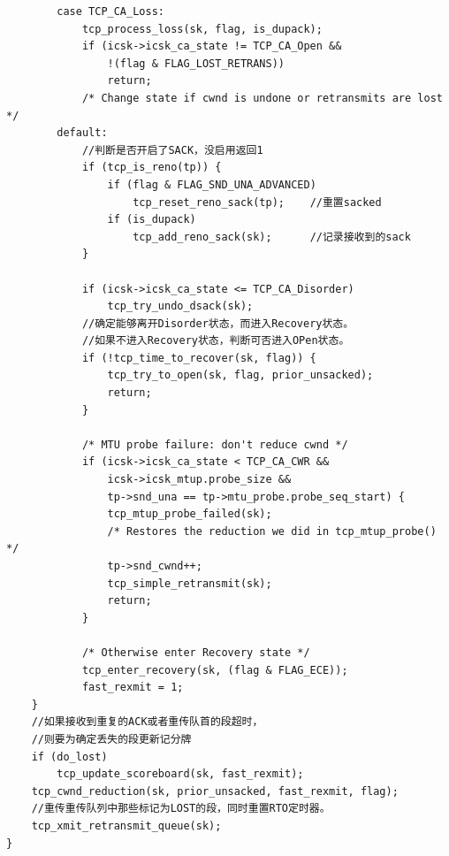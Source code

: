 \begin{verbatim}
        case TCP_CA_Loss:
            tcp_process_loss(sk, flag, is_dupack);
            if (icsk->icsk_ca_state != TCP_CA_Open &&
                !(flag & FLAG_LOST_RETRANS))
                return;
            /* Change state if cwnd is undone or retransmits are lost */
        default:
            //判断是否开启了SACK，没启用返回1 
            if (tcp_is_reno(tp)) {
                if (flag & FLAG_SND_UNA_ADVANCED)
                    tcp_reset_reno_sack(tp);    //重置sacked
                if (is_dupack)
                    tcp_add_reno_sack(sk);      //记录接收到的sack
            }

            if (icsk->icsk_ca_state <= TCP_CA_Disorder)
                tcp_try_undo_dsack(sk);
            //确定能够离开Disorder状态，而进入Recovery状态。    
            //如果不进入Recovery状态，判断可否进入OPen状态。
            if (!tcp_time_to_recover(sk, flag)) {
                tcp_try_to_open(sk, flag, prior_unsacked);
                return;
            }

            /* MTU probe failure: don't reduce cwnd */
            if (icsk->icsk_ca_state < TCP_CA_CWR &&
                icsk->icsk_mtup.probe_size &&
                tp->snd_una == tp->mtu_probe.probe_seq_start) {
                tcp_mtup_probe_failed(sk);
                /* Restores the reduction we did in tcp_mtup_probe() */
                tp->snd_cwnd++;
                tcp_simple_retransmit(sk);
                return;
            }

            /* Otherwise enter Recovery state */
            tcp_enter_recovery(sk, (flag & FLAG_ECE));
            fast_rexmit = 1;
    }
    //如果接收到重复的ACK或者重传队首的段超时，
    //则要为确定丢失的段更新记分牌
    if (do_lost)
        tcp_update_scoreboard(sk, fast_rexmit);
    tcp_cwnd_reduction(sk, prior_unsacked, fast_rexmit, flag);
    //重传重传队列中那些标记为LOST的段，同时重置RTO定时器。 
    tcp_xmit_retransmit_queue(sk);
}

\end{verbatim}
